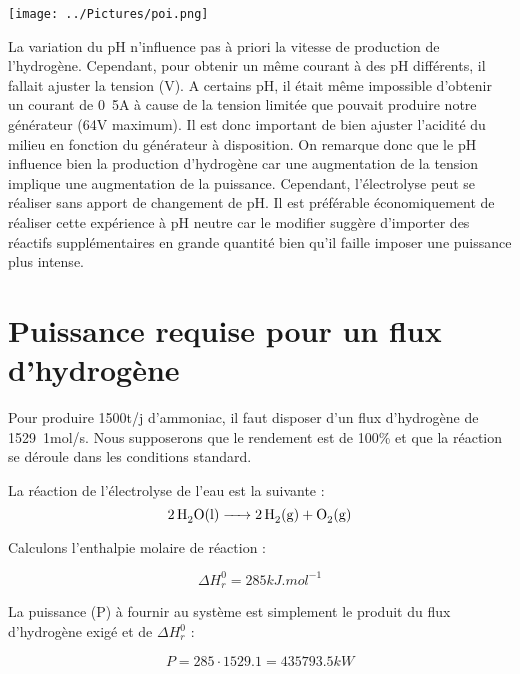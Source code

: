 \documentclass[10pt,a4paper]{article}
\begin{document}
\texttt{[image: ../Pictures/poi.png]} 

La variation du pH n'influence pas à priori la vitesse de production de l'hydrogène. Cependant, pour obtenir un même courant à des pH différents, il fallait ajuster la tension (V). A certains pH, il était même impossible d'obtenir un courant de \unit{0.5}{A} à cause de la tension limitée que pouvait produire notre générateur (\unit{64}{V} maximum). Il est donc important de bien ajuster l'acidité du milieu en fonction du générateur à disposition. On remarque donc que le pH influence bien la production d'hydrogène car une augmentation de la tension implique une augmentation de la puissance. Cependant, l'électrolyse peut se réaliser sans apport de changement de pH. Il est  préférable économiquement de réaliser cette expérience à pH neutre car le modifier suggère d'importer des réactifs supplémentaires en grande quantité bien qu'il faille imposer une puissance plus intense. 

\section{Puissance requise pour un flux d'hydrogène}

Pour produire \unit{1500}{t/j} d'ammoniac, il faut disposer d'un flux d'hydrogène de \unit{1529.1}{mol/s}. Nous supposerons que le rendement est de \unit{100}{\%} et que la réaction se déroule dans les conditions standard. 

La réaction de l’électrolyse de l'eau est la suivante : 
$$\ce {2H2O(l) -> 2H2(g) + O2(g)}$$ 

Calculons l'enthalpie molaire de réaction :

$$ \Delta H_r^0 =  \unit{285}{kJ.mol^{-1}} $$

La puissance (P) à fournir au système est simplement le produit du flux d'hydrogène exigé et de $ \Delta H_r^0$ :

$$ P = 285\cdot1529.1 = \unit{435 793.5}{kW} $$
\end{document}

